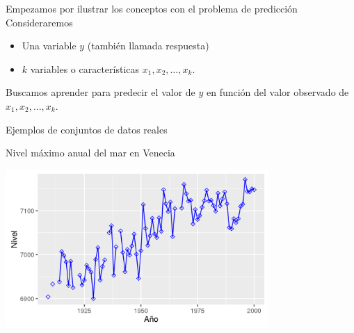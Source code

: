 \documentclass[aspectratio=169]{beamer}
\begin{document}
 \begin{frame}
   \begin{block}{Empezamos por ilustrar los conceptos con el problema de predicción}
Consideraremos 
     \begin{itemize}
     \item Una variable $y$ (también llamada \alert{respuesta})
     \item $k$ variables o  \alert{características}  $x_1, x_2, \ldots, x_k$.
     \end{itemize}
Buscamos aprender para predecir el valor de $y$  en función del valor
observado de  $x_1, x_2, \ldots, x_k$.
   \end{block}

 \end{frame}
       \begin{frame}{Ejemplos de conjuntos de datos reales}
   
{\scriptsize Nivel máximo anual del mar en Venecia}
\begin{center}
    \includegraphics[height=6cm]{venecia.png}
  \end{center}
   
 \end{frame}
   
\end{document}

